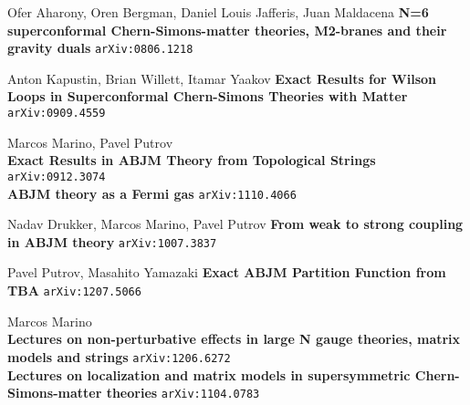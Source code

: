 \documentclass[12pt]{article}
\begin{document}
\begin{thebibliography}{}

\item Ofer Aharony, Oren Bergman, Daniel Louis Jafferis, Juan Maldacena \textbf{N=6 superconformal Chern-Simons-matter theories, M2-branes and their gravity duals} \texttt{arXiv:0806.1218}

\item Anton Kapustin, Brian Willett, Itamar Yaakov \textbf{Exact Results for Wilson Loops in Superconformal Chern-Simons Theories with Matter}  \texttt{arXiv:0909.4559}
\\ 
\item Marcos Marino, Pavel Putrov \\ 
\textbf{Exact Results in ABJM Theory from Topological Strings}  \texttt{arXiv:0912.3074} \\
\textbf{ABJM theory as a Fermi gas} \texttt{arXiv:1110.4066}
\item Nadav Drukker, Marcos Marino, Pavel Putrov \textbf{From weak to strong coupling in ABJM theory} \texttt{arXiv:1007.3837}
\item Pavel Putrov, Masahito Yamazaki \textbf{Exact ABJM Partition Function from TBA} \texttt{arXiv:1207.5066}

\item Marcos Marino \\ 
\textbf{Lectures on non-perturbative effects in large N gauge theories, matrix models and strings} \texttt{arXiv:1206.6272} \\
\textbf{Lectures on localization and matrix models in supersymmetric Chern-Simons-matter theories} \texttt{arXiv:1104.0783}


\end{thebibliography}
\end{document}
